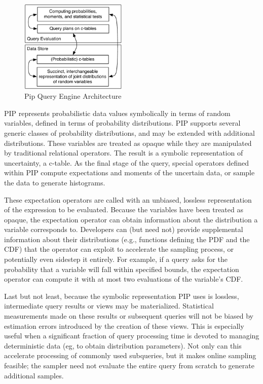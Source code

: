 %
\begin{figure}
\begin{center}
\includegraphics[width=2in]{graphics/arch.pdf}
\vspace*{-0.1in}
\caption{Pip Query Engine Architecture}
\label{fig:arch}
\end{center}
\vspace*{-0.35in}
\end{figure}

PIP represents probabilistic data values symbolically in terms of random variables, defined in terms of probability distributions.  PIP supports several generic classes of probability distributions, and may be extended with additional distributions.  These variables are treated as opaque while they are manipulated by traditional relational operators.  The result is a symbolic representation of uncertainty, a c-table.  As the final stage of the query, special operators defined within PIP compute expectations and moments of the uncertain data, or sample the data to generate histograms.  

These expectation operators are called with an unbiased, lossless representation of the expression to be evaluated.  Because the variables have been treated as opaque, the expectation operator can obtain information about the distribution a variable corresponds to.  Developers can (but need not) provide supplemental information about their distributions (e.g., functions defining the PDF and the CDF) that the operator can exploit to accelerate the sampling process, or potentially even sidestep it entirely.  For example, if a query asks for the probability that a variable will fall within specified bounds, the expectation operator can compute it with at most two evaluations of the variable's CDF.

Last but not least, because the symbolic representation PIP uses is lossless, intermediate query results or views may be materialized.  Statistical measurements made on these results or subsequent queries will not be biased by estimation errors introduced by the creation of these views.  This is especially useful when a significant fraction of query processing time is devoted to managing deterministic data (eg, to obtain distribution parameters).  Not only can this accelerate processing of commonly used subqueries, but it makes online sampling feasible; the sampler need not evaluate the entire query from scratch to generate additional samples.



